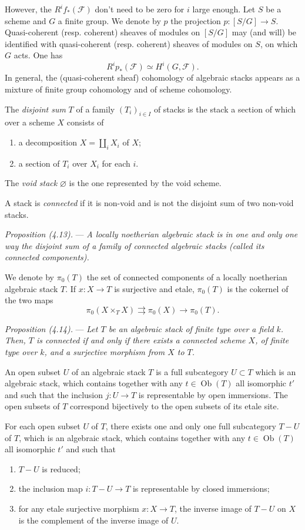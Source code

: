 \documentclass[10pt]{article}
\begin{document}
However, the $R^if_*(\mathscr F)$ don't need to be zero for $i$ large enough. Let $S$ be a scheme and $G$ a finite group. We denote by $p$ the projection $p:[S/G]\to S$. Quasi-coherent (resp. coherent) sheaves of modules on $[S/G]$ may (and will) be identified with quasi-coherent (resp. coherent) sheaves of modules on $S$, on which $G$ acts. One has
\[
R^i p_*(\mathscr F)\simeq H^i(G,\mathscr F).
\]
In general, the (quasi-coherent sheaf) cohomology of algebraic stacks appears as a mixture of finite group cohomology and of scheme cohomology.

The \emph{disjoint sum} $T$ of a family $(T_i)_{i\in I}$ of stacks is the stack a section of which over a scheme $X$ consists of
\begin{enumerate}[label=(\roman*)]
\item a decomposition $X=\coprod_i X_i$ of $X$;
\item a section of $T_i$ over $X_i$ for each $i$.
\end{enumerate}

The \emph{void stack} $\varnothing$ is the one represented by the void scheme.

A stack is \emph{connected} if it is non-void and is not the disjoint sum of two non-void stacks.

\medskip
\noindent\emph{Proposition (4.13).} --- \emph{A locally noetherian algebraic stack is in one and only one way the disjoint sum of a family of connected algebraic stacks (called its connected components).}

We denote by $\pi_0(T)$ the set of connected components of a locally noetherian algebraic stack $T$. If $x:X\to T$ is surjective and etale, $\pi_0(T)$ is the cokernel of the two maps
\[
\pi_0(X\times_T X)\rightrightarrows \pi_0(X)\longrightarrow \pi_0(T).
\]

\medskip
\noindent\emph{Proposition (4.14).} --- \emph{Let $T$ be an algebraic stack of finite type over a field $k$. Then, $T$ is connected if and only if there exists a connected scheme $X$, of finite type over $k$, and a surjective morphism from $X$ to $T$.}

An open subset $U$ of an algebraic stack $T$ is a full subcategory $U\subset T$ which is an algebraic stack, which contains together with any $t\in\operatorname{Ob}(T)$ all isomorphic $t'$ and such that the inclusion $j:U\to T$ is representable by open immersions. The open subsets of $T$ correspond bijectively to the open subsets of its etale site.

For each open subset $U$ of $T$, there exists one and only one full subcategory $T-U$ of $T$, which is an algebraic stack, which contains together with any $t\in\operatorname{Ob}(T)$ all isomorphic $t'$ and such that
\begin{enumerate}[label=(\roman*)]
\item $T-U$ is reduced;
\item the inclusion map $i:T-U\to T$ is representable by closed immersions;
\item for any etale surjective morphism $x:X\to T$, the inverse image of $T-U$ on $X$ is the complement of the inverse image of $U$.
\end{enumerate}
\end{document}
